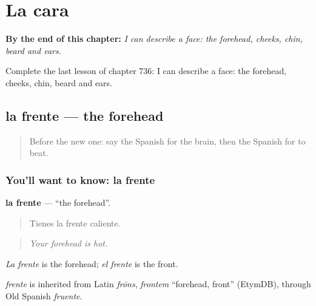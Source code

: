
\chapter{La cara}
\label{ch:es-la-cara}

\begin{chapteropening}
\textbf{By the end of this chapter:} \emph{I can describe a face: the forehead, cheeks, chin, beard and ears.}

Complete the last lesson of chapter 736: I can describe a face: the forehead, cheeks, chin, beard and ears.
\end{chapteropening}

\section[la frente]{la frente — the forehead}

\label{lesson:ES-C736-frente}



\begin{quote}
Before the new one: say the Spanish for the brain, then the Spanish for to beat.
\end{quote}

\subsection*{You'll want to know: la frente}
\textbf{la frente} — \textquotedblleft{}the forehead\textquotedblright{}.

\begin{quote}
Tienes la frente caliente.
\end{quote}

\begin{quote}
\emph{Your forehead is hot.}
\end{quote}

\emph{La frente} is the forehead; \emph{el frente} is the front.

\begin{cousinweb}
\emph{frente} is inherited from Latin \emph{frōns}, \emph{frontem} \textquotedblleft{}forehead, front\textquotedblright{} (EtymDB), through Old Spanish \emph{fruente}.
\end{cousinweb}

